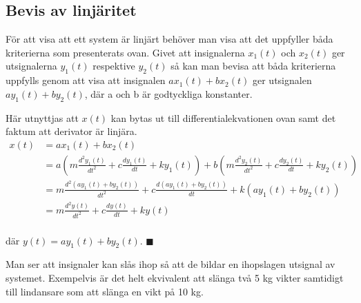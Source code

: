 \subsection{Bevis av linjäritet}
För att visa att ett system är linjärt behöver man visa att det uppfyller båda kriterierna som presenterats ovan. 
Givet att insignalerna $x_1(t)$ och $x_2(t)$ ger utsignalerna $y_1(t)$ respektive $y_2(t)$ så kan man bevisa att båda kriterierna uppfylls  genom att visa att insignalen $ax_1(t) + bx_2(t)$ ger utsignalen $ay_1(t) + by_2(t)$, där a och b är godtyckliga konstanter.

Här utnyttjas att $x(t)$  kan bytas ut till differentialekvationen ovan samt det faktum att derivator är linjära.
\begin{equation*} \label{eq1.6a}
\begin{split}
x(t)
&=ax_1(t)+bx_2(t)\\
&=a\left(m\frac{d^2y_1(t)}{dt^2}+c\frac{dy_1(t)}{dt}+ky_1(t)\right)+b\left(m\frac{d^2y_2(t)}{dt^2}+c\frac{dy_2(t)}{dt}+ky_2(t)\right)\\
&=m\frac{d^2(ay_1(t)+by_2(t))}{dt^2}+c\frac{d(ay_1(t)+by_2(t))}{dt}+k(ay_1(t)+by_2(t))\\
&=m\frac{d^2y(t)}{dt^2}+c\frac{dy(t)}{dt}+ky(t)\\
\end{split}
\end{equation*} 


där $y(t)=ay_1(t)+by_2(t)$. $\blacksquare$

Man ser att insignaler kan slås ihop så att de bildar en ihopslagen utsignal av systemet. Exempelvis är det helt ekvivalent att slänga två 5 kg vikter samtidigt till lindansare som att slänga en vikt på 10 kg.
 

